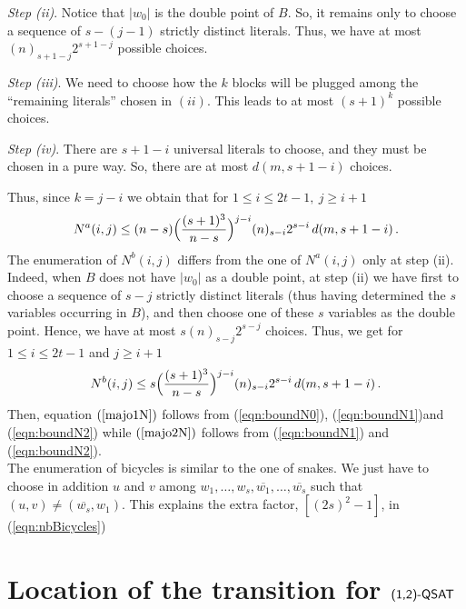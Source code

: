 \documentclass[aop,noinfoline]{imsart}
\renewcommand{\Box}{{\vrule width0.6ex height1em depth0cm}}
\newenvironment{proof}{\noindent{\bf Proof:}}{\hfill \Box}
\newcommand{\onetwoqsat}{\mbox{\sf (1,2)-QSAT}}
\newcommand{\negate}[1]{\overline{#1}}
\begin{document}
\begin{proof}
\emph{Step (ii)}. Notice that   $\vert w_0\vert $ is the double point of $B$. So, it remains only to choose a sequence of $s-(j-1)$  strictly distinct literals.
Thus,
we have at most $(n)_{s+1-j}2^{s+1-j}$ possible choices.

\emph{Step (iii)}.
 We need to choose how the $k$  blocks will be plugged among the ``remaining literals''  chosen in
$(ii)$. 
This
leads to at most $(s+1)^{k}$ possible choices.

\emph{Step (iv)}. There are $s+1-i$ universal literals to choose, and they must be chosen in
a pure way. So, there are at most $d(m, s+1-i)$ choices.

Thus, since   $k=j-i$ we obtain that   for $1\leq i \leq 2t-1, \ j \geq i+1$
\begin{equation}\label{eqn:boundN1}
 N^{a}(i,j) \leq (n-s) \Bigl ( \frac{ (s+1)^3}{n-s} \Bigr ) ^{j-i}  (n)_{s-i}2^{s-i}\, d(m,s+1-i)\, .
\end{equation}
The enumeration of $N^{b}(i,j)$ differs from the one of $N^{a}(i,j)$ only at step (ii). Indeed, when $B$ does not have $\vert w_0 \vert $ as a double point, at step (ii) we have first to choose  a sequence of $s-j$  strictly distinct literals (thus having  determined the $s$ variables occurring in $B$), and then choose one of these $s$   variables as the double point. Hence, we have at most $s(n)_{s-j}2^{s-j}$ choices.
Thus, we get  for  $1\leq i \leq 2t-1$ and $ j \geq i+1$
\begin{equation}\label{eqn:boundN2}
   N^{b}(i,j) \leq s \Bigl ( \frac{ (s+1)^3}{n-s} \Bigr ) ^{j-i} (n)_{s-i}2^{s-i}\, d(m,s+1-i)\, .
\end{equation}
Then, equation  $(\ref{majo1N})$ follows from (\ref{eqn:boundN0}), (\ref{eqn:boundN1})and  (\ref{eqn:boundN2}) while  $(\ref{majo2N})$  follows from (\ref{eqn:boundN1}) and (\ref{eqn:boundN2}).\\
 
 The enumeration of bicycles is similar to the one of snakes. We just have to choose in addition $u$ and $v$ among $w_1,\ldots, w_s,\negate{w_1},\ldots, \negate{w_s}$ such that   $(u,v)\ne (\negate{w_s}, w_1)$. This explains  the  extra factor, $ [(2s)^2 -1]$, in (\ref{eqn:nbBicycles})

\end{proof}






\section{Location of the   transition for
$\onetwoqsat$}\label{sec:transition}
\end{document}
